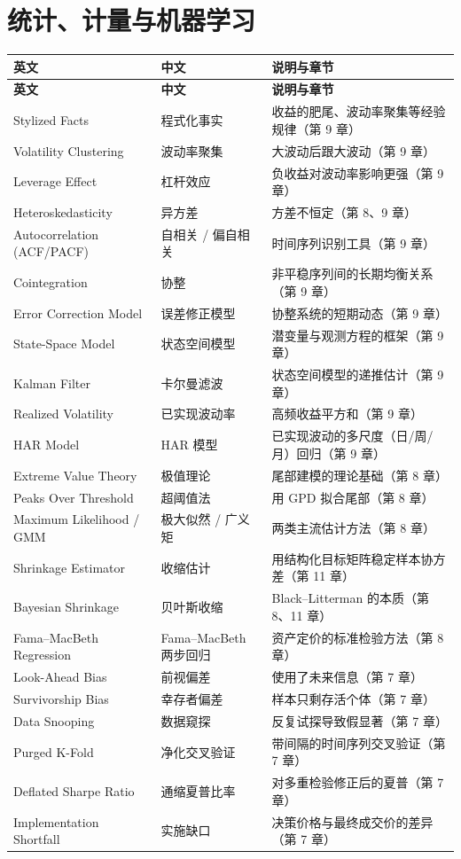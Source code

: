 \section{统计、计量与机器学习}

{\tablefont
\begin{longtable}{@{}L{4.6cm}L{3.6cm}L{6.6cm}@{}}
\toprule
\textbf{英文} & \textbf{中文} & \textbf{说明与章节} \\
\midrule
\endfirsthead
\toprule
\textbf{英文} & \textbf{中文} & \textbf{说明与章节} \\
\midrule
\endhead
\bottomrule
\endlastfoot
Stylized Facts & 程式化事实 & 收益的肥尾、波动率聚集等经验规律（第 9 章） \\
Volatility Clustering & 波动率聚集 & 大波动后跟大波动（第 9 章） \\
Leverage Effect & 杠杆效应 & 负收益对波动率影响更强（第 9 章） \\
Heteroskedasticity & 异方差 & 方差不恒定（第 8、9 章） \\
Autocorrelation (ACF/PACF) & 自相关 / 偏自相关 & 时间序列识别工具（第 9 章） \\
Cointegration & 协整 & 非平稳序列间的长期均衡关系（第 9 章） \\
Error Correction Model & 误差修正模型 & 协整系统的短期动态（第 9 章） \\
State-Space Model & 状态空间模型 & 潜变量与观测方程的框架（第 9 章） \\
Kalman Filter & 卡尔曼滤波 & 状态空间模型的递推估计（第 9 章） \\
Realized Volatility & 已实现波动率 & 高频收益平方和（第 9 章） \\
HAR Model & HAR 模型 & 已实现波动的多尺度（日/周/月）回归（第 9 章） \\
Extreme Value Theory & 极值理论 & 尾部建模的理论基础（第 8 章） \\
Peaks Over Threshold & 超阈值法 & 用 GPD 拟合尾部（第 8 章） \\
Maximum Likelihood / GMM & 极大似然 / 广义矩 & 两类主流估计方法（第 8 章） \\
Shrinkage Estimator & 收缩估计 & 用结构化目标矩阵稳定样本协方差（第 11 章） \\
Bayesian Shrinkage & 贝叶斯收缩 & Black--Litterman 的本质（第 8、11 章） \\
Fama--MacBeth Regression & Fama--MacBeth 两步回归 & 资产定价的标准检验方法（第 8 章） \\
Look-Ahead Bias & 前视偏差 & 使用了未来信息（第 7 章） \\
Survivorship Bias & 幸存者偏差 & 样本只剩存活个体（第 7 章） \\
Data Snooping & 数据窥探 & 反复试探导致假显著（第 7 章） \\
Purged K-Fold & 净化交叉验证 & 带间隔的时间序列交叉验证（第 7 章） \\
Deflated Sharpe Ratio & 通缩夏普比率 & 对多重检验修正后的夏普（第 7 章） \\
Implementation Shortfall & 实施缺口 & 决策价格与最终成交价的差异（第 7 章） \\
\end{longtable}
}

